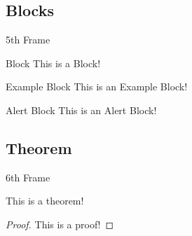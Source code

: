 \documentclass[12pt, aspectratio=169, xcolor={table}]{beamer}
\begin{document}
	\subsection{Blocks}
	\begin{frame}{5th Frame}
		\begin{block}{Block}
			This is a Block!
		\end{block}
		\pause
		\begin{exampleblock}{Example Block}
			This is an Example Block!
		\end{exampleblock}
		\pause
		\begin{alertblock}{Alert Block}
			This is an Alert Block!
		\end{alertblock}
	\end{frame}
	\subsection{Theorem}
	\begin{frame}{6th Frame}
		\begin{theorem}
			This is a theorem!
		\end{theorem}
		\pause
		\begin{proof}
			This is a proof!
		\end{proof}
	\end{frame}
\end{document}
